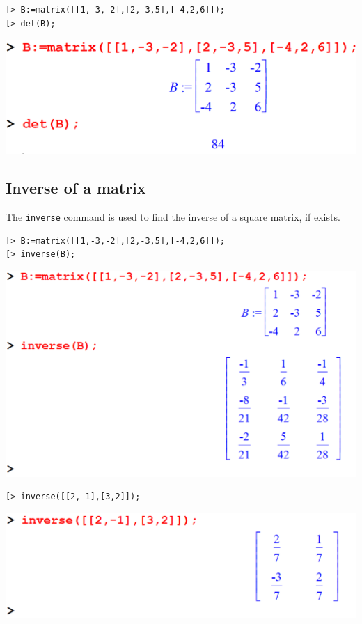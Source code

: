 \documentclass[
]{book}
\theoremstyle{definition}
\theoremstyle{definition}
\theoremstyle{definition}
\theoremstyle{definition}
\theoremstyle{remark}
\begin{document}
\begin{verbatim}
[> B:=matrix([[1,-3,-2],[2,-3,5],[-4,2,6]]);
[> det(B);
\end{verbatim}

\includegraphics{figures/Lesson 4/fig13.png}

\subsection{Inverse of a matrix}\label{inverse-of-a-matrix}

The \texttt{inverse} command is used to find the inverse of a square matrix, if exists.

\begin{verbatim}
[> B:=matrix([[1,-3,-2],[2,-3,5],[-4,2,6]]);
[> inverse(B);
\end{verbatim}

\includegraphics{figures/Lesson 4/fig14.png}

\begin{verbatim}
[> inverse([[2,-1],[3,2]]);
\end{verbatim}

\includegraphics{figures/Lesson 4/fig15.png}
\end{document}
